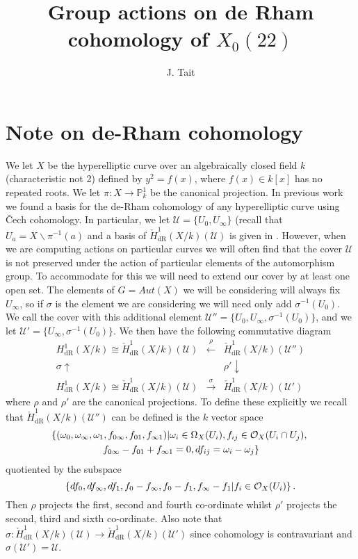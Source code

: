 \documentclass[draft, 11pt]{article} %
\title{Group actions on de Rham cohomology of $X_0(22)$}
\author{J. Tait}
\theoremstyle{plain}
\theoremstyle{remark}
\newcommand{\cO}{{\cal O}}
\newcommand{\ra}{\rightarrow}
\newcommand{\cU}{{\mathcal U}}
\newcommand{\cech}{\v{C}ech }
\newcommand{\derhamhone}{H_{\text {dR}}^1(X/k)}
\newcommand{\cechderhamhone}{\check{H}_{\text {dR}}^1(X/k)}
\begin{document}
\maketitle
\listoftodos
\bigskip

\section{Note on de-Rham cohomology}
We let $X$ be the hyperelliptic curve over an algebraically closed field $k$ (characteristic not 2) defined by $y^2 = f(x)$, where $f(x) \in k[x]$ has no repeated roots.
We let $\pi \colon X \ra \mathbb P^1_k$ be the canonical projection.
In previous work we found a basis for the de-Rham cohomology of any hyperelliptic curve using \cech cohomology.
In particular, we let $\cU = \{ U_0 , U_\infty\}$ (recall that $U_a = X\backslash \pi^{-1}(a)$ and a basis of $\cechderhamhone(\cU)$ is given in \cite{derhamactions}.
However, when we are computing actions on particular curves we will often find that the cover $\cU$ is not preserved under the action of particular elements of the automorphism group.
To accommodate for this we will need to extend our cover by at least one open set.
The elements of $G= Aut(X)$ we will be considering will always fix $U_\infty$, so if $\sigma$ is the element we are considering we will need only add $\sigma^{-1}(U_0)$.
We call the cover with this additional element $\cU'' = \{U_0, U_\infty, \sigma^{-1}(U_0)\}$, and we let $\cU' = \{U_\infty, \sigma^{-1}(U_0)\}$.
We then have the following commutative diagram
\[
\begin{array}{ccc}
\derhamhone \cong \cechderhamhone(\cU)  & \xleftarrow{\rho} & \cechderhamhone(\cU'')  \\
\sigma\uparrow & ~ & \rho'\downarrow  \\
\derhamhone \cong \cechderhamhone(\cU)  & \xrightarrow{\sigma} & \cechderhamhone(\cU')
\end{array}
\]
where $\rho$ and $\rho'$ are the canonical projections.
To define these explicitly we recall that $\cechderhamhone(\cU'')$ can be defined is the $k$ vector space 
\begin{multline}
\left\{ (\omega_0, \omega_\infty , \omega_1, f_{0\infty}, f_{01},f_{\infty 1}) | \omega_i \in \Omega_X(U_i), f_{ij} \in \cO_X(U_i \cap U_j), \right. \\ \left. f_{0\infty} - f_{01} + f_{\infty1} = 0, df_{ij} = \omega_i - \omega_j \right\}
\end{multline}
quotiented by the subspace 
\[
\left\{ df_0, df_\infty, df_1, f_0- f_\infty, f_0 - f_1, f_\infty - f_1 | f_i \in \cO_X(U_i)\right\}.
\]
Then $\rho$ projects the first, second and fourth co-ordinate  whilst $\rho'$ projects the second, third and sixth co-ordinate.
Also note that $\sigma \colon \cechderhamhone(\cU) \ra \cechderhamhone (\cU')$ since cohomology is contravariant and $\sigma (\cU') = \cU$.
\end{document}
